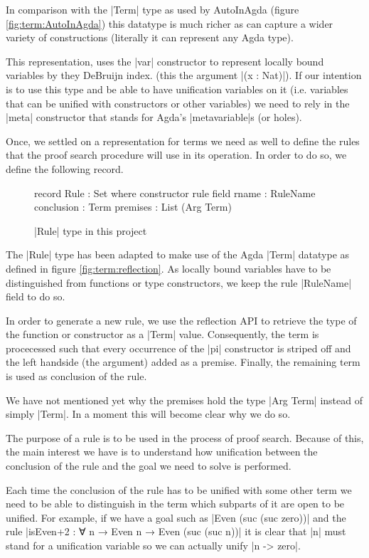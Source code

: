 \documentclass[a4paper]{article}
\begin{document}
In comparison with the |Term| type as used by AutoInAgda (figure
\ref{fig:term:AutoInAgda}) this datatype is much richer as can capture a wider
variety of constructions (literally it can represent any Agda type).

This representation, uses the |var| constructor to represent locally bound
variables by they DeBruijn index. (this the argument |(x : Nat)|). If our
intention is to use this type and be able to have unification variables on it
(i.e. variables that can be unified with constructors or other variables) we
need to rely in the |meta| constructor that stands for Agda's |metavariable|s (or
holes).

Once, we settled on a representation for terms we need as well to define the
rules that the proof search procedure will use in its operation. In order to do
so, we define the following record.

\begin{figure}
\small
\begin{code}
  record Rule : Set where
    constructor rule
    field
      rname       : RuleName
      conclusion  : Term
      premises    : List (Arg Term)
\end{code}
  \label{fig:rule:reflection}
  \caption{|Rule| type in this project}
\end{figure}

The |Rule| type has been adapted to make use of the Agda |Term| datatype as
defined in figure \ref{fig:term:reflection}. As locally bound variables have to
be distinguished from functions or type constructors, we keep the rule |RuleName|
field to do so.

In order to generate a new rule, we use the reflection API to retrieve the type
of the function or constructor as a |Term| value. Consequently, the term is
procecessed such that every occurrence of the |pi| constructor is striped off and
the left handside (the argument) added as a premise. Finally, the remaining term
is used as conclusion of the rule.

We have not mentioned yet why the premises hold the type |Arg Term| instead of
simply |Term|. In a moment this will become clear why we do so.

The purpose of a rule is to be used in the process of proof search. Because of
this, the main interest we have is to understand how unification between the
conclusion of the rule and the goal we need to solve is performed.

Each time the conclusion of the rule has to be unified with some other term we
need to be able to distinguish in the term which subparts of it are open to be
unified. For example, if we have a goal such as |Even (suc (suc zero))| and the
rule |isEven+2 : ∀ {n} → Even n → Even (suc (suc n))| it is clear that
|n| must stand for a unification variable so we can actually unify |n -> zero|.
\end{document}
